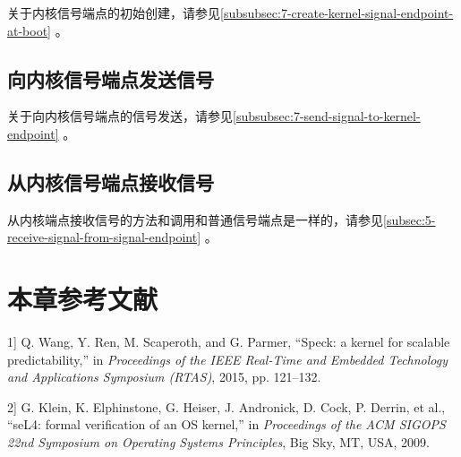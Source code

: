 关于内核信号端点的初始创建，请参见\ref{subsubsec:7-create-kernel-signal-endpoint-at-boot}
。

\subsection{向内核信号端点发送信号}\label{subsec:6-send-signal-to-kernel-signal-endpoint}

关于向内核信号端点的信号发送，请参见\ref{subsubsec:7-send-signal-to-kernel-endpoint}
。

\subsection{从内核信号端点接收信号}\label{subsec:6-receive-signal-from-kernel-signal-endpoint}

从内核端点接收信号的方法和调用和普通信号端点是一样的，请参见\ref{subsec:5-receive-signal-from-signal-endpoint}
。

\section{本章参考文献}\label{sec:6-chapter-bibliography}

\protect{}\label{cite:6-1}

\noindent {[}1{]} Q. Wang, Y. Ren, M. Scaperoth, and G. Parmer, ``Speck: a kernel for scalable predictability,'' in \textit{Proceedings of the IEEE Real-Time and Embedded Technology and Applications Symposium (RTAS)}, 2015, pp. 121--132.

\protect{}\label{cite:6-2}

\noindent {[}2{]} G. Klein, K. Elphinstone, G. Heiser, J. Andronick, D. Cock, P. Derrin, et al., ``seL4: formal verification of an OS kernel,'' in \textit{Proceedings of the ACM SIGOPS 22nd Symposium on Operating Systems Principles}, Big Sky, MT, USA, 2009.

